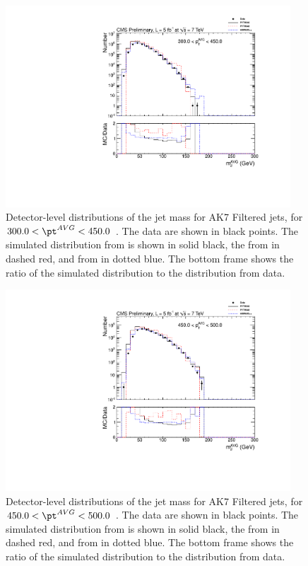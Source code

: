 \begin{figure}[htbp]
\centering
\includegraphics[width=0.95\textwidth]{figs/histAK7MjetVsPtAvg_rawDataMCComparisons_pt_5_Filtered}
\caption{Detector-level distributions of the jet mass for AK7 Filtered jets,
for $300.0 < \pt^{AVG} < 450.0$ \GeVc. The data are shown in black points.
The simulated distribution from \PYTHIA is shown in solid black, 
the from \PYTHIAEIGHT in dashed red, and from \HERWIG in dotted blue. 
The bottom frame shows the ratio of the simulated distribution
to the distribution from data. 
\label{figs:histAK7MjetVsPtAvg_rawDataMCComparisons_pt_5_Filtered}}
\end{figure}

\fi

\ifnpas

\begin{figure}[htbp]
\centering
\includegraphics[width=0.95\textwidth]{figs/histAK7MjetVsPtAvg_rawDataMCComparisons_pt_6_Filtered}
\caption{Detector-level distributions of the jet mass for AK7 Filtered jets,
for $450.0 < \pt^{AVG} < 500.0$ \GeVc. The data are shown in black points.
The simulated distribution from \PYTHIA is shown in solid black, 
the from \PYTHIAEIGHT in dashed red, and from \HERWIG in dotted blue. 
The bottom frame shows the ratio of the simulated distribution
to the distribution from data. 
\label{figs:histAK7MjetVsPtAvg_rawDataMCComparisons_pt_6_Filtered}}
\end{figure}



